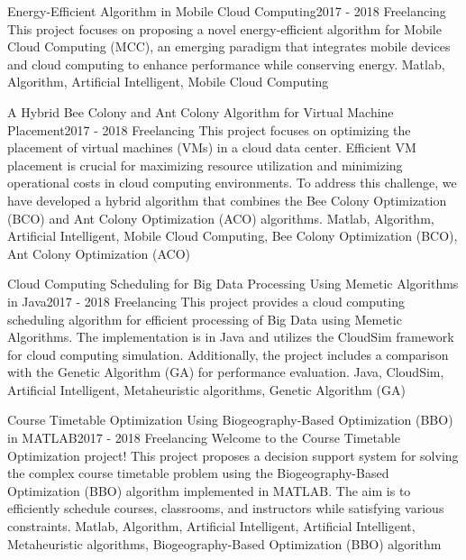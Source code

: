 \begin{projects}
	\project
	{Energy-Efficient Algorithm in Mobile Cloud Computing}{2017 - 2018}
	{ {Freelancing} }
	{This project focuses on proposing a novel energy-efficient algorithm for Mobile Cloud Computing (MCC), an emerging paradigm that integrates mobile devices and cloud computing to enhance performance while conserving energy.}
	{Matlab, Algorithm, Artificial Intelligent, Mobile Cloud Computing}

	
	\project
	{A Hybrid Bee Colony and Ant Colony Algorithm for Virtual Machine Placement}{2017 - 2018}
	{ {Freelancing} }
	{This project focuses on optimizing the placement of virtual machines (VMs) in a cloud data center. Efficient VM placement is crucial for maximizing resource utilization and minimizing operational costs in cloud computing environments. To address this challenge, we have developed a hybrid algorithm that combines the Bee Colony Optimization (BCO) and Ant Colony Optimization (ACO) algorithms.}
	{Matlab, Algorithm, Artificial Intelligent, Mobile Cloud Computing, Bee Colony Optimization (BCO), Ant Colony Optimization (ACO)}

	\project
	{Cloud Computing Scheduling for Big Data Processing Using Memetic Algorithms in Java}{2017 - 2018}
	{ {Freelancing} }
	{This project provides a cloud computing scheduling algorithm for efficient processing of Big Data using Memetic Algorithms. The implementation is in Java and utilizes the CloudSim framework for cloud computing simulation. Additionally, the project includes a comparison with the Genetic Algorithm (GA) for performance evaluation.}
	{Java, CloudSim, Artificial Intelligent, Metaheuristic algorithms, Genetic Algorithm (GA)}

	\project
	{Course Timetable Optimization Using Biogeography-Based Optimization (BBO) in MATLAB}{2017 - 2018}
	{ {Freelancing} }
	{Welcome to the Course Timetable Optimization project! This project proposes a decision support system for solving the complex course timetable problem using the Biogeography-Based Optimization (BBO) algorithm implemented in MATLAB. The aim is to efficiently schedule courses, classrooms, and instructors while satisfying various constraints.}
	{Matlab, Algorithm, Artificial Intelligent, Artificial Intelligent, Metaheuristic algorithms, Biogeography-Based Optimization (BBO) algorithm}

\end{projects}